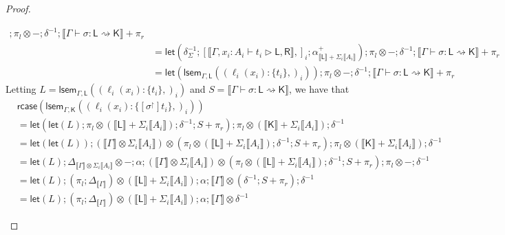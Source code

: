 \documentclass[acmsmall,screen,review]{acmart}
\newcommand{\ms}[1]{\ensuremath{\mathsf{#1}}}
\newcommand{\lto}{:}
\newcommand{\wbranch}[3]{#1(#2) \lto \{#3\}}
\newcommand{\rupg}[1]{{#1}^\upharpoonright}
\newcommand{\bhyp}[2]{#1 : #2}
\newcommand{\haslb}[3]{#1 \vdash #2 \rhd #3}
\newcommand{\lbsubst}[4]{#1 \vdash #2: #3 \rightsquigarrow #4}
\newcommand{\dnt}[1]{\llbracket{#1}\rrbracket}
\newcommand{\dmor}[1]{{\Delta}_{#1}}
\newcommand{\loopmor}[3]{\ms{lsem}_{#1, #3}(#2)}
\newcommand{\lmor}[1]{\ms{let}(#1)}
\newcommand{\rcase}[1]{\ms{rcase}(#1)}
\begin{document}
\begin{proof}
\begin{itemize}[leftmargin=*]
\begin{equation}
\begin{aligned}
          ; \pi_l \otimes -
          ; \delta^{-1} 
          ; \dnt{\lbsubst{\Gamma}{\sigma}{\ms{L}}{\ms{K}}} + \pi_r \\
        & = \lmor{
          \delta^{-1}_{\Sigma}
            ; [\dnt{\haslb{\Gamma, \bhyp{x_i}{A_i}}{t_i}{\ms{L}, \ms{R}}},]_i 
            ; \alpha^+_{\dnt{\ms{L}} + \Sigma_i \dnt{A_i}}
            } 
          ; \pi_l \otimes -
          ; \delta^{-1} 
          ; \dnt{\lbsubst{\Gamma}{\sigma}{\ms{L}}{\ms{K}}} + \pi_r \\
        & = \lmor{\loopmor{\Gamma}{(\wbranch{\ell_i}{x_i}{t_i},)_i}{\ms{L}}} 
          ; \pi_l \otimes -
          ; \delta^{-1} 
          ; \dnt{\lbsubst{\Gamma}{\sigma}{\ms{L}}{\ms{K}}} + \pi_r
      \end{aligned}
    \end{equation}
    Letting $L = \loopmor{\Gamma}{(\wbranch{\ell_i}{x_i}{t_i},)_i}{\ms{L}}$ and
    $S = \dnt{\lbsubst{\Gamma}{\sigma}{\ms{L}}{\ms{K}}}$, we have that
    \begin{equation}
      \begin{aligned}
        & \rcase{\loopmor{\Gamma}{(\wbranch{\ell_i}{x_i}{[\rupg{\sigma}]t_i},)_i}{\ms{K}}} \\
        & = \lmor{
            \lmor{L} 
            ; \pi_l \otimes (\dnt{\ms{L}} + \Sigma_i\dnt{A_i})
            ; \delta^{-1} ; S + \pi_r}
          ; \pi_l \otimes (\dnt{\ms{K}} + \Sigma_i\dnt{A_i}) ; \delta^{-1}
          \\
        & = \lmor{\lmor{L}} 
          ; (\dnt{\Gamma} \otimes \Sigma_i\dnt{A_i}) 
            \otimes (\pi_l \otimes (\dnt{\ms{L}} + \Sigma_i\dnt{A_i}) ; \delta^{-1} ; S + \pi_r)
          ; \pi_l \otimes (\dnt{\ms{K}} + \Sigma_i\dnt{A_i}) ; \delta^{-1} \\
        & = \lmor{L}
          ; \dmor{\dnt{\Gamma} \otimes \Sigma_i\dnt{A_i}} \otimes -
          ; \alpha
          ; (\dnt{\Gamma} \otimes \Sigma_i\dnt{A_i}) 
          \otimes (\pi_l \otimes (\dnt{\ms{L}} + \Sigma_i\dnt{A_i}) ; \delta^{-1} ; S + \pi_r)
          ; \pi_l \otimes - ; \delta^{-1} \\
        & = \lmor{L}
          ; (\pi_l ; \dmor{\dnt{\Gamma}}) \otimes (\dnt{\ms{L}} + \Sigma_i\dnt{A_i})
          ; \alpha
          ; \dnt{\Gamma}
          \otimes (\delta^{-1} ; S + \pi_r)
          ; \delta^{-1} \\
        & = \lmor{L}
          ; (\pi_l ; \dmor{\dnt{\Gamma}}) \otimes (\dnt{\ms{L}} + \Sigma_i\dnt{A_i})
          ; \alpha
          ; \dnt{\Gamma}
          \otimes \delta^{-1}

\end{aligned}
\end{equation}
\end{itemize}
\end{proof}
\end{document}
